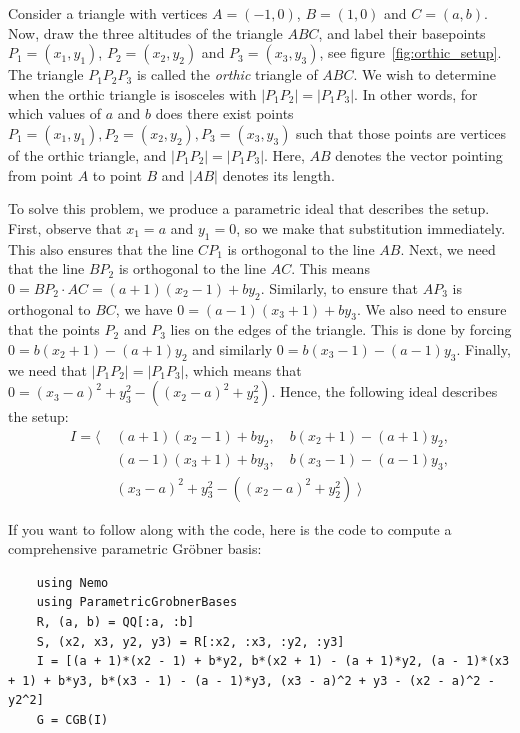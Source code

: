 \begin{example}\label{ex:quant_elim}\upshape
  Consider a triangle with vertices $A = (-1, 0)$, $B = (1, 0)$ and $C = (a, b)$. Now, draw the three altitudes of the triangle $ABC$, and label their basepoints $P_{1} = (x_{1}, y_{1})$, $P_{2} = (x_{2}, y_{2})$ and $P_{3} = (x_{3}, y_{3})$, see figure~\ref{fig:orthic_setup}. The triangle $P_{1}P_{2}P_{3}$ is called the \textit{orthic} triangle of $ABC$. We wish to determine when the orthic triangle is isosceles with $|P_{1}P_{2}| = |P_{1}P_{3}|$. In other words, for which values of $a$ and $b$ does there exist points $P_{1} = (x_{1}, y_{1}), P_{2} = (x_{2}, y_{2}), P_{3} = (x_{3}, y_{3})$ such that those points are vertices of the orthic triangle, and $|P_{1}P_{2}| = |P_{1}P_{3}|$. Here, $AB$ denotes the vector pointing from point $A$ to point $B$ and $|AB|$ denotes its length.

  To solve this problem, we produce a parametric ideal that describes the setup. First, observe that $x_{1} = a$ and $y_{1} = 0$, so we make that substitution immediately. This also ensures that the line $CP_{1}$ is orthogonal to the line $AB$. Next, we need that the line $BP_{2}$ is orthogonal to the line $AC$. This means $0 = BP_{2} \cdot AC = (a + 1)(x_{2} - 1) + b y_{2}$. Similarly, to ensure that $AP_{3}$ is orthogonal to $BC$, we have $0 = (a - 1)(x_{3} + 1) + b y_{3}$. We also need to ensure that the points $P_{2}$ and $P_{3}$ lies on the edges of the triangle. This is done by forcing $0 = b(x_{2} + 1) - (a + 1)y_{2}$ and similarly $0 = b(x_{3} - 1) - (a - 1)y_{3}$. Finally, we need that $|P_{1}P_{2}| = |P_{1}P_{3}|$, which means that $0 = {(x_{3} - a)}^{2} + y_{3}^{2} - ({(x_{2} - a)}^{2} + y_{2}^{2})$. Hence, the following ideal describes the setup:
  \begin{align*}
    I = \langle\; &(a + 1)(x_{2} - 1) + b y_{2}, \quad  b(x_{2} + 1) - (a + 1)y_{2}, \\
                  &(a - 1)(x_{3} + 1) + b y_{3}, \quad  b(x_{3} - 1) - (a - 1)y_{3}, \\
                  & {(x_{3} - a)}^{2} + y_{3}^{2} - ({(x_{2} - a)}^{2} + y_{2}^{2}) \; \rangle
  \end{align*}

  If you want to follow along with the code, here is the code to compute a comprehensive parametric Gröbner basis:
  \begin{verbatim}
    using Nemo
    using ParametricGrobnerBases
    R, (a, b) = QQ[:a, :b]
    S, (x2, x3, y2, y3) = R[:x2, :x3, :y2, :y3]
    I = [(a + 1)*(x2 - 1) + b*y2, b*(x2 + 1) - (a + 1)*y2, (a - 1)*(x3 + 1) + b*y3, b*(x3 - 1) - (a - 1)*y3, (x3 - a)^2 + y3 - (x2 - a)^2 - y2^2]
    G = CGB(I)
  \end{verbatim}


\end{example}
